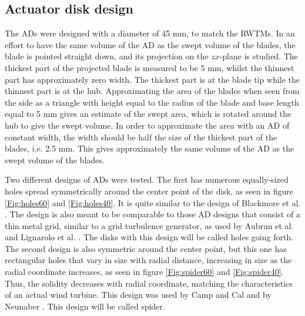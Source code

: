 \subsection{Actuator disk design}
The \gls{AD}s were designed with a diameter of 45 \si{\mm}, to match the \gls{RWTM}s. In an effort to have the same volume of the \gls{AD} as the swept volume of the blades, the blade is pointed straight down, and its projection on the $z$$x$-plane is studied. The thickest part of the projected blade is measured to be 5 \si{\mm}, whilst the thinnest part has approximately zero width. The thickest part is at the blade tip while the thinnest part is at the hub. Approximating the area of the blades when seen from the side as a triangle with height equal to the radius of the blade and base length equal to 5 \si{\mm} gives an estimate of the swept area, which is rotated around the hub to give the swept volume. In order to approximate the area with an \gls{AD} of constant width, the width should be half the size of the thickest part of the blades, i.e. 2.5 \si{\mm}. This gives approximately the same volume of the \gls{AD} as the swept volume of the blades.    



Two different designs of \gls{AD}s were tested. The first has numerous equally-sized holes spread symmetrically around the center point of the disk, as seen in figure \ref{Fig:holes60} and \ref{Fig:holes40}. It is quite similar to the design of Blackmore et al.  \cite{Blackmore2013}. The design is also meant to be comparable to those \gls{AD} designs that consist of a thin metal grid, similar to a grid turbulence generator, as used by Aubrun et al. and Lignarolo et al. \cite{Aubrun2013, Lignarolo2016}. The disks with this design will be called \gls{holes} going forth. The second design is also symmetric around the center point, but this one has rectangular holes that vary in size with radial distance, increasing in size as the radial coordinate increases, as seen in figure \ref{Fig:spider60} and \ref{Fig:spider40}. Thus, the solidity decreases with radial coordinate, matching the characteristics of an actual wind turbine. This design was used by Camp and Cal \cite{Camp2016, Camp2019} and by Neunaber \cite{Neunaber}. This design will be called \gls{spider}. 


